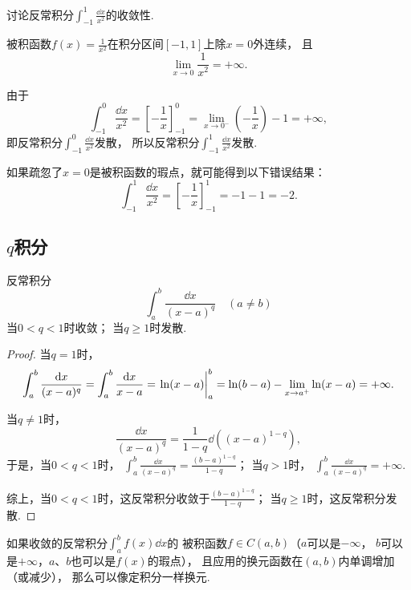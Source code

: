 \begin{example}
讨论反常积分\(\int_{-1}^1 \frac{\dd{x}}{x^2}\)的收敛性.
\begin{solution}
被积函数\(f(x) = \frac{1}{x^2}\)在积分区间\([-1,1]\)上除\(x=0\)外连续，
且\[
	\lim_{x\to0} \frac{1}{x^2} = +\infty.
\]

由于\[
	\int_{-1}^0 \frac{\dd{x}}{x^2}
	= \left[-\frac{1}{x}\right]_{-1}^0
	= \lim_{x\to0^-} \left(-\frac{1}{x}\right) - 1
	= +\infty,
\]
即反常积分\(\int_{-1}^0 \frac{\dd{x}}{x^2}\)发散，
所以反常积分\(\int_{-1}^1 \frac{\dd{x}}{x^2}\)发散.
\end{solution}
\end{example}
\begin{remark}
如果疏忽了\(x=0\)是被积函数的瑕点，就可能得到以下错误结果：\[
	\int_{-1}^1 \frac{\dd{x}}{x^2}
	= \left[ -\frac{1}{x} \right]_{-1}^1
	= -1 - 1 = -2.
\]
\end{remark}

\subsection{\texorpdfstring{\(q\)}{q}积分}
\begin{proposition}[\(q\)积分]\label{example:定积分.q积分}
反常积分\[
	\int_a^b \frac{\dd{x}}{(x-a)^q}
	\quad(a \neq b)
\]
当\(0 < q < 1\)时收敛；
当\(q \geq 1\)时发散.
\begin{proof}
当\(q=1\)时，\[
	\int_a^b \frac{\dd{x}}{(x-a)^q}
	= \int_a^b \frac{\dd{x}}{x-a}
	= \eval{\ln(x-a)}_a^b
	= \ln(b-a) - \lim_{x \to a^+} \ln(x-a)
	= +\infty.
\]

当\(q\neq1\)时，\[
	\frac{\dd{x}}{(x-a)^q}
	= \frac{1}{1-q} \dd((x-a)^{1-q}),
\]
于是，当\(0<q<1\)时，
\(\int_a^b \frac{\dd{x}}{(x-a)^q}
= \frac{(b-a)^{1-q}}{1-q}\)；
当\(q>1\)时，
\(\int_a^b \frac{\dd{x}}{(x-a)^q}
= +\infty\).

综上，当\(0<q<1\)时，这反常积分收敛于\(\frac{(b-a)^{1-q}}{1-q}\)；
当\(q\geq1\)时，这反常积分发散.
\end{proof}
\end{proposition}

如果收敛的反常积分\(\int_a^b f(x) \dd{x}\)的
被积函数\(f \in C(a,b)\)（\(a\)可以是\(-\infty\)，
\(b\)可以是\(+\infty\)，\(a\)、\(b\)也可以是\(f(x)\)的瑕点），
且应用的换元函数在\((a,b)\)内单调增加（或减少），
那么可以像定积分一样换元.

